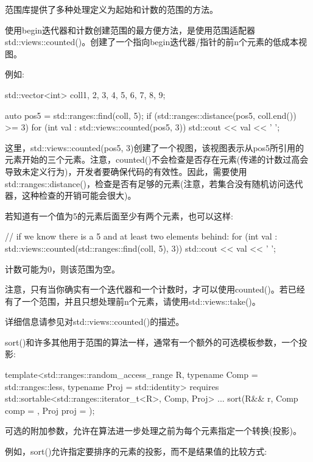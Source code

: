 
范围库提供了多种处理定义为起始和计数的范围的方法。

使用begin迭代器和计数创建范围的最方便方法，是使用范围适配器std::views::counted()。创建了一个指向begin迭代器/指针的前n个元素的低成本视图。

例如:

\begin{cpp}
std::vector<int> coll{1, 2, 3, 4, 5, 6, 7, 8, 9};

auto pos5 = std::ranges::find(coll, 5);
if (std::ranges::distance(pos5, coll.end()) >= 3) {
	for (int val : std::views::counted(pos5, 3)) {
		std::cout << val << ' ';
	}
}
\end{cpp}

这里，std::views::counted(pos5, 3)创建了一个视图，该视图表示从pos5所引用的元素开始的三个元素。注意，counted()不会检查是否存在元素(传递的计数过高会导致未定义行为)，开发者要确保代码的有效性。因此，需要使用std::ranges::distance()，检查是否有足够的元素(注意，若集合没有随机访问迭代器，这种检查的开销可能会很大)。

若知道有一个值为5的元素后面至少有两个元素，也可以这样:

\begin{cpp}
// if we know there is a 5 and at least two elements behind:
for (int val : std::views::counted(std::ranges::find(coll, 5), 3)) {
	std::cout << val << ' ';
}
\end{cpp}

计数可能为0，则该范围为空。

注意，只有当你确实有一个迭代器和一个计数时，才可以使用counted()。若已经有了一个范围，并且只想处理前n个元素，请使用std::views::take()。

详细信息请参见对std::views::counted()的描述。


sort()和许多其他用于范围的算法一样，通常有一个额外的可选模板参数，一个投影:

\begin{cpp}
template<std::ranges::random_access_range R,
			typename Comp = std::ranges::less,
			typename Proj = std::identity>
requires std::sortable<std::ranges::iterator_t<R>, Comp, Proj>
... sort(R&& r, Comp comp = {}, Proj proj = {});
\end{cpp}

可选的附加参数，允许在算法进一步处理之前为每个元素指定一个转换(投影)。

例如，sort()允许指定要排序的元素的投影，而不是结果值的比较方式:

